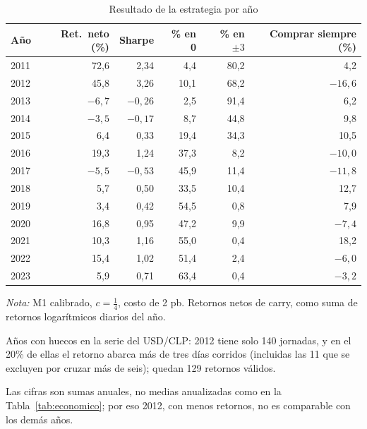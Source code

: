 \documentclass[11pt,a4paper]{article}
\begin{document}
\begin{table}[htbp]\centering\small
\caption{Resultado de la estrategia por año}\label{tab:anual}
\begin{threeparttable}
\begin{tabular}{l rr rr r}
\toprule
Año & Ret.\ neto (\%) & Sharpe & \% en 0 & \% en $\pm3$ & Comprar siempre (\%) \\
\midrule
2011\tnote{a} & 72,6 & 2,34 & 4,4 & 80,2 & 4,2 \\
2012\tnote{a} & 45,8 & 3,26 & 10,1 & 68,2 & $-16{,}6$ \\
2013 & $-6{,}7$ & $-0{,}26$ & 2,5 & 91,4 & 6,2 \\
2014 & $-3{,}5$ & $-0{,}17$ & 8,7 & 44,8 & 9,8 \\
2015 & 6,4 & 0,33 & 19,4 & 34,3 & 10,5 \\
2016 & 19,3 & 1,24 & 37,3 & 8,2 & $-10{,}0$ \\
2017 & $-5{,}5$ & $-0{,}53$ & 45,9 & 11,4 & $-11{,}8$ \\
2018 & 5,7 & 0,50 & 33,5 & 10,4 & 12,7 \\
2019 & 3,4 & 0,42 & 54,5 & 0,8 & 7,9 \\
\midrule
2020 & 16,8 & 0,95 & 47,2 & 9,9 & $-7{,}4$ \\
2021 & 10,3 & 1,16 & 55,0 & 0,4 & 18,2 \\
2022 & 15,4 & 1,02 & 51,4 & 2,4 & $-6{,}0$ \\
2023 & 5,9 & 0,71 & 63,4 & 0,4 & $-3{,}2$ \\
\bottomrule
\end{tabular}
\begin{tablenotes}\footnotesize
\item \emph{Nota:} M1 calibrado, \(c=\tfrac14\), costo de 2 pb. Retornos netos de carry, como suma de retornos logarítmicos diarios del año.
\item[a] Años con huecos en la serie del USD/CLP: 2012 tiene solo 140 jornadas, y en el 20\% de ellas el retorno abarca más de tres días corridos (incluidas las 11 que se excluyen por cruzar más de seis); quedan 129 retornos válidos.
\item Las cifras son sumas anuales, no medias anualizadas como en la Tabla~\ref{tab:economico}; por eso 2012, con menos retornos, no es comparable con los demás años.
\end{tablenotes}
\end{threeparttable}
\end{table}
\end{document}
